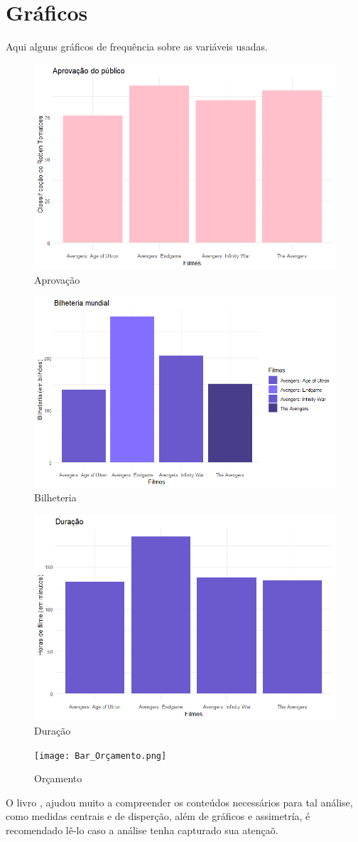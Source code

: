 \documentclass[
    12pt,                  %
    openright,             %
    oneside,               %
    a4paper,               %
    chapter=TITLE,         %
    section=TITLE,         %
    brazil                 %
]{abntex2}                 %
\begin{document}
\section{Gráficos}
Aqui alguns gráficos de frequência sobre as variáveis usadas.\\
\begin{figure}[h]
    \centering
    \includegraphics[width=0.55\linewidth]{Bar_Aprovação.png}
    \caption{Aprovação}
    \label{fig:enter-label}
\end{figure}
\begin{figure}[h]
    \centering
    \includegraphics[width=0.65\linewidth]{Bar_Bilheteria.png}
    \caption{Bilheteria}
    \label{fig:enter-label}
\end{figure}
\begin{figure}[h]
    \centering
    \includegraphics[width=0.55\linewidth]{Bar_Duração.png}
    \caption{Duração}
    \label{fig:enter-label}
\end{figure}
\begin{figure}[h]
    \centering
    \texttt{[image: Bar\_Orçamento.png]}
    \caption{Orçamento}
    \label{fig:enter-label}
\end{figure}\newpage
\noindent O livro \cite{Bussab2017}, ajudou muito a compreender os conteúdos necessários para tal análise, como medidas centrais e de disperção, além de gráficos e assimetría, é recomendado lê-lo caso a análise tenha capturado sua atençaõ.
\newpage
\end{document}
